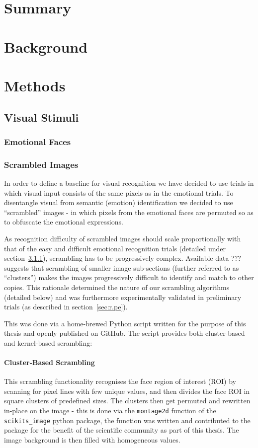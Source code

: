 
\chapter{Summary}
\readme
\chapter{Background}
\chapter{Methods}
    \section{Visual Stimuli}
	\subsection{Emotional Faces}\label{sec:m.vs.ef}
	\subsection{Scrambled Images}\label{sec:m.vs.si}
	In order to define a baseline for visual recognition we have decided to use trials in which visual input consists of the same pixels as in the emotional trials. 
	To disentangle visual from semantic (emotion) identification we decided to use “scrambled” images - in which pixels from the emotional faces are permuted so as to obfuscate the emotional expressions.
	
	As recognition difficulty of scrambled images should scale proportionally with that of the easy and difficult emotional recognition trials (detailed under section~\ref{sec:m.vs.ef}), scrambling has to be progressively complex.
	Available data ??? suggests that scrambling of smaller image sub-sections (further referred to as “clusters”) makes the images progressively difficult to identify and match to other copies.
	This rationale determined the nature of our scrambling algorithms (detailed below) and was furthermore experimentally validated in preliminary trials (as described in section~\ref{sec:r.pe}).
	
	This was done via a home-brewed Python script written for the purpose of this thesis and openly published on GitHub.
	The script provides both cluster-based and kernel-based scrambling:
	    \subsubsection{Cluster-Based Scrambling}
	    This scrambling functionality recognises the face region of interest (ROI) by scanning for pixel lines with few unique values, and then divides the face ROI in square clusters of predefined sizes.
	    The clusters then get permuted and rewritten in-place on the image - this is done via the \colorbox{vlg}{\texttt{montage2d}} function of the \colorbox{vlg}{\texttt{scikits\_image}} python package, the function was written and contributed to the package for the benefit of the scientific community as part of this thesis.
	    The image background is then filled with homogeneous values.
